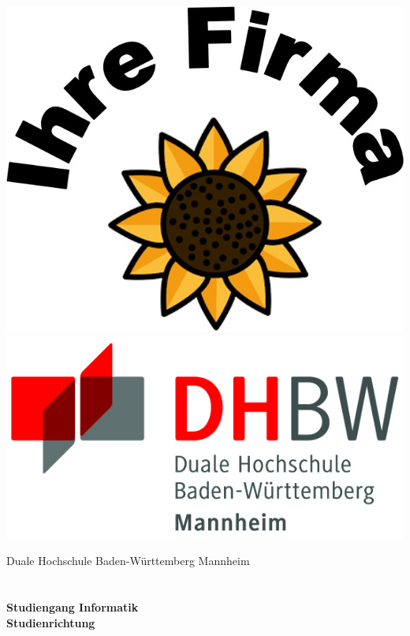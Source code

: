 \begin{titlepage}
    \begin{minipage}{\textwidth}
            \vspace{-2cm}
            \noindent \includegraphics[scale=0.25]{images/firmenlogo.jpg} \hfill \includegraphics{images/logo.jpg}
    \end{minipage}
    \vspace{1em}
    \begin{center}
        {\textsf{\large Duale Hochschule Baden-W\"urttemberg Mannheim}}\\[4em]
        {\textsf{\textbf{\large{\TheTypeOfWork}}}}\\[6mm]
        {\textsf{\textbf{\Large{}\TheTitle}}} \\[1.5cm]
        {\textsf{\textbf{\large{}Studiengang Informatik}}\\[6mm]
        \textsf{\textbf{Studienrichtung \TheFieldOfStudy}}}\vspace{10em}
        

\end{center}
\end{titlepage}
